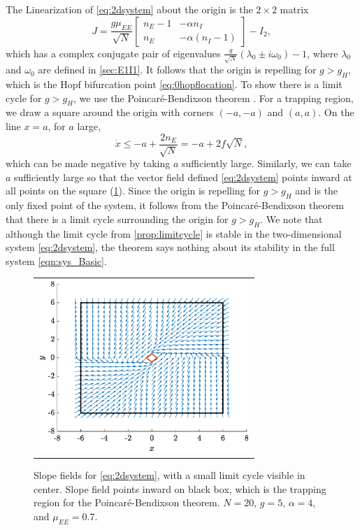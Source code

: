 \documentclass[reqno]{siamonline190516}
\begin{document}
The Linearization of \cref{eq:2dsystem} about the origin is the $2 \times 2$ matrix
\[
J = \frac{g \mu_{EE}}{\sqrt{N}}
\begin{bmatrix} 
n_E - 1 & -\alpha n_I \\
n_E & -\alpha(n_I - 1)
\end{bmatrix} - I_2,
\]
which has a complex conjugate pair of eigenvalues $\frac{g}{\sqrt{N}}(\lambda_0 \pm i \omega_0) - 1$, where $\lambda_0$ and $\omega_0$ are defined in \cref{sec:E1I1}. It follows that the origin is repelling for $g > g_H$, which is the Hopf bifurcation point \cref{eq:0hopflocation}. To show there is a limit cycle for $g > g_H$, we use the Poincar{\'e}-Bendixson theorem \cite[Chapter 16]{Coddington1955}. For a trapping region, we draw a square around the origin with corners $(-a, -a)$ and $(a, a)$. On the line $x = a$, for $a$ large,
\[
\dot{x} \leq -a + \frac{2 n_E}{\sqrt{N}} = -a + 2 f \sqrt{N},
\]
which can be made negative by taking $a$ sufficiently large. Similarly, we can take $a$ sufficiently large so that the vector field defined \cref{eq:2dsystem} points inward at all points on the square (\cref{fig:nullclines}). Since the origin is repelling for $g > g_H$ and is the only fixed point of the system, it follows from the Poincar{\'e}-Bendixson theorem that there is a limit cycle surrounding the origin for $g > g_H$. We note that although the limit cycle from \cref{prop:limitcycle} is stable in the two-dimensional system \cref{eq:2dsystem}, the theorem says nothing about its stability in the full system \cref{eqn:sys_Basic}.
\begin{figure}
    \centering
    \begin{tabular}{c}
    \includegraphics[width=8cm]{images/trappingregion.eps}
    \end{tabular}
    \caption{Slope fields for \cref{eq:2dsystem}, with a small limit cycle visible in center. Slope field points inward on black box, which is the trapping region for the Poincar{\'e}-Bendixson theorem. $N = 20$, $g = 5$, $\alpha = 4$, and $\mu_{EE} = 0.7$.}
    \label{fig:nullclines}
\end{figure}
\end{document}
